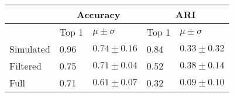 \begin{tabular}{lllll}
\toprule
{} & \multicolumn{2}{c}{Accuracy} &   \multicolumn{2}{c}{ARI} \\
\midrule
{} & Top 1 & $\mu \pm \sigma$ & Top 1 & $\mu \pm \sigma$ \\
Simulated &  0.96 &  $0.74 \pm 0.16 $  & 0.84 &  $0.33 \pm 0.32 $\\
Filtered  & 0.75 &  $0.71 \pm 0.04 $ & 0.52 &  $0.38 \pm 0.14 $\\
Full      & 0.71 &  $0.61 \pm 0.07 $ &  0.32 &  $0.09 \pm 0.10 $   \\
\bottomrule
\end{tabular}